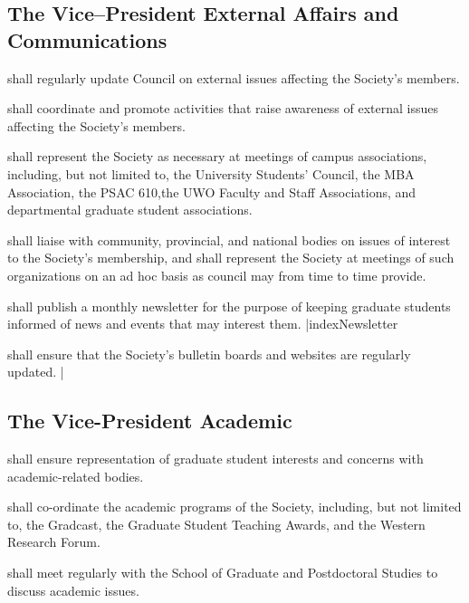 \subsection {The Vice--President External Affairs and Communications}
\begin{longenum}[ label*=\arabic*., align=left]
	\item shall regularly update Council on external issues affecting the Society's members.
    \item shall coordinate and promote activities that raise awareness of external issues affecting the Society's members.
    \item shall represent the Society as necessary at meetings of campus associations, including, but not limited to, the University Students' Council, the MBA Association, the PSAC 610,the UWO Faculty and Staff Associations, and departmental graduate student associations. 
    \item shall liaise with community, provincial, and national bodies on issues of interest to the Society's membership, and shall represent the Society at meetings of such organizations on an ad hoc basis as council may from time to time provide.
    \item shall publish a monthly newsletter for the purpose of keeping graduate students informed of news and events that may interest them.
     |index{Newsletter}
    \item shall ensure that the Society's bulletin boards and websites are regularly updated.
     |
\end{longenum}


\subsection {The Vice-President Academic} 
\begin{longenum}[ label*=\arabic*., align=left]
	\item shall ensure representation of graduate student interests and concerns with academic-related bodies.
    \item shall co-ordinate the academic programs of the Society, including, but not limited to, the Gradcast, the Graduate Student Teaching Awards, and the Western Research Forum.
    \item shall meet regularly with the School of Graduate and Postdoctoral Studies to discuss academic issues.
\end{longenum}


